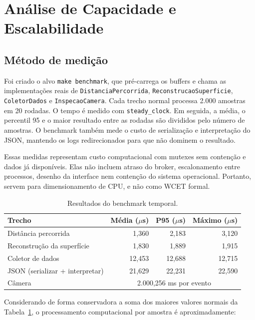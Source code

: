 \documentclass[12pt,a4paper]{article}
\begin{document}
\section{Análise de Capacidade e Escalabilidade}

\subsection{Método de medição}

Foi criado o alvo \texttt{make benchmark}, que pré-carrega os buffers e chama as implementações reais de \texttt{DistanciaPercorrida}, \texttt{ReconstrucaoSuperficie}, \texttt{ColetorDados} e \texttt{InspecaoCamera}. Cada trecho normal processa 2.000 amostras em 20 rodadas. O tempo é medido com \texttt{steady\_clock}. Em seguida, a média, o percentil 95 e o maior resultado entre as rodadas são divididos pelo número de amostras. O benchmark também mede o custo de serialização e interpretação do JSON, mantendo os logs redirecionados para que não dominem o resultado.

Essas medidas representam custo computacional com mutexes sem contenção e dados já disponíveis. Elas não incluem atraso do broker, escalonamento entre processos, desenho da interface nem contenção do sistema operacional. Portanto, servem para dimensionamento de CPU, e não como WCET formal.

\begin{table}[H]
    \centering
    \caption{Resultados do benchmark temporal.}
    \label{tab:benchmark}
    \begin{tabular}{lrrr}
        \toprule
        \textbf{Trecho} & \textbf{Média ($\mu$s)} & \textbf{P95 ($\mu$s)} & \textbf{Máximo ($\mu$s)} \\
        \midrule
        Distância percorrida & 1,360 & 2,183 & 3,120 \\
        Reconstrução da superfície & 1,830 & 1,889 & 1,915 \\
        Coletor de dados & 12,453 & 12,688 & 12,715 \\
        JSON (serializar + interpretar) & 21,629 & 22,231 & 22,590 \\
        \midrule
        Câmera & \multicolumn{3}{c}{2.000,256 ms por evento} \\
        \bottomrule
    \end{tabular}
\end{table}

Considerando de forma conservadora a soma dos maiores valores normais da Tabela~\ref{tab:benchmark}, o processamento computacional por amostra é aproximadamente:
\end{document}
